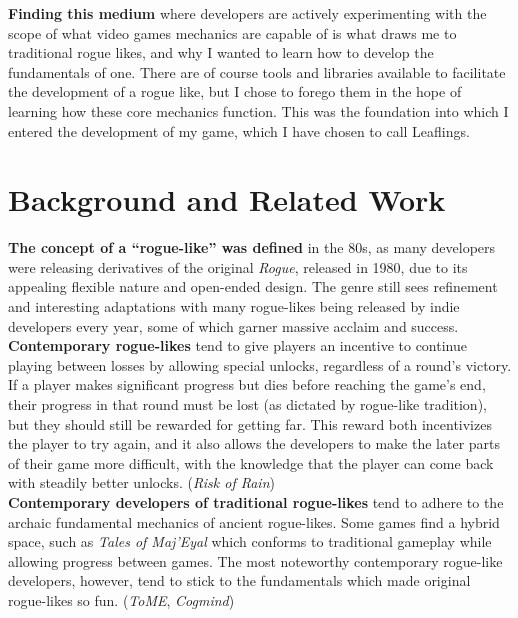 \documentclass[sigconf,nonacm]{acmart}
\begin{document}
\textbf {Finding this medium} where developers are actively experimenting with the scope of what video games mechanics are capable of is what draws me to traditional rogue likes, and why I wanted to learn how to develop the fundamentals of one. There are of course tools and libraries available to facilitate the development of a rogue like, but I chose to forego them in the hope of learning how these core mechanics function. This was the foundation into which I entered the development of my game, which I have chosen to call Leaflings.\\

\pagebreak

\section{Background and Related Work}

\textbf {The concept of a “rogue-like” was defined} in the 80s, as many developers were releasing derivatives of the original \textit {Rogue}, released in 1980, due to its appealing flexible nature and open-ended design. The genre still sees refinement and interesting adaptations with many rogue-likes being released by indie developers every year, some of which garner massive acclaim and success.\\

\textbf {Contemporary rogue-likes} tend to give players an incentive to continue playing between losses by allowing special unlocks, regardless of a round’s victory. If a player makes significant progress but dies before reaching the game’s end, their progress in that round must be lost (as dictated by rogue-like tradition), but they should still be rewarded for getting far. This reward both incentivizes the player to try again, and it also allows the developers to make the later parts of their game more difficult, with the knowledge that the player can come back with steadily better unlocks. (\textit{Risk of Rain})\\

\textbf {Contemporary developers of traditional rogue-likes} tend to adhere to the archaic fundamental mechanics of ancient rogue-likes. Some games find a hybrid space, such as \textit{Tales of Maj’Eyal} which conforms to traditional gameplay while allowing progress between games. The most noteworthy contemporary rogue-like developers, however, tend to stick to the fundamentals which made original rogue-likes so fun. (\textit{ToME}, \textit{Cogmind})\\
\end{document}
